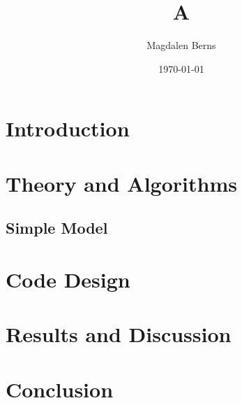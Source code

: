 \documentclass[12pt]{article}
\title{A }
\author{Magdalen Berns}
\date{\today}
\begin{document}
\maketitle
\thispagestyle{empty}

\begin{abstract}
\noindent

\end{abstract}

\clearpage
\tableofcontents
\thispagestyle{empty}
\clearpage
\section{Introduction}
\section{Theory and Algorithms}
\subsection{Simple Model}
\section{Code Design}
\section{Results and Discussion}
\section{Conclusion}


\end{document}
